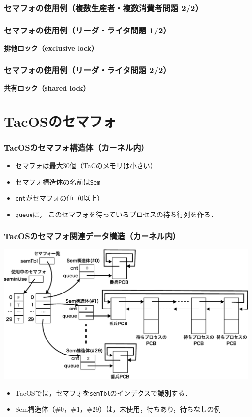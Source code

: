 \documentclass{beamer}                   %
\begin{document}
\begin{frame}
  \frametitle{セマフォの使用例（複数生産者・複数消費者問題 2/2）}
  
\end{frame}

\begin{frame}
  \frametitle{セマフォの使用例（リーダ・ライタ問題 1/2）}
  
  {\bf 排他ロック（exclusive lock）}
\end{frame}

\begin{frame}
  \frametitle{セマフォの使用例（リーダ・ライタ問題 2/2）}
  
  {\bf 共有ロック（shared lock）}
\end{frame}

\section{TacOSのセマフォ}
\begin{frame}
  \frametitle{TacOSのセマフォ構造体（カーネル内）}
  
  \begin{itemize}
    \item セマフォは最大30個（TaCのメモリは小さい）
    \item セマフォ構造体の名前は{\tt Sem}
    \item {\tt cnt}がセマフォの値（0以上）
    \item {\tt queue}に，
      このセマフォを待っているプロセスの待ち行列を作る．
  \end{itemize}
\end{frame}

\begin{frame}
  \frametitle{TacOSのセマフォ関連データ構造（カーネル内）}
  \begin{center}
    \includegraphics[scale=0.45]{Fig/tacosSemaphore-crop.pdf}
  \end{center}
  \begin{itemize}
    \item TacOSでは，セマフォを{\tt semTbl}のインデクスで識別する．
    \item Sem構造体（\#0，\#1，\#29）は，未使用，待ちあり，待ちなしの例
  \end{itemize}
\end{frame}
\end{document}
